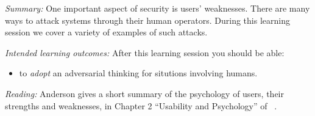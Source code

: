 \emph{Summary:}
One important aspect of security is users' weaknesses.
There are many ways to attack systems through their human operators.
During this learning session we cover a variety of examples of such attacks.

\emph{Intended learning outcomes:}
After this learning session you should be able:
\begin{itemize}
  \item to \emph{adopt} an adversarial thinking for situtions involving humans.
\end{itemize}

\emph{Reading:}
Anderson gives a short summary of the psychology of users, their strengths and 
weaknesses, in Chapter 2 ``Usability and Psychology'' of 
~\cite{Anderson2008sea}.
